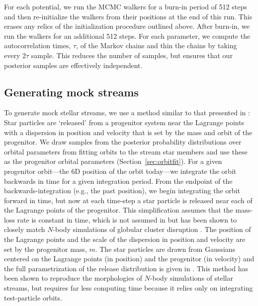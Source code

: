 \documentclass[letterpaper,12pt,preprint]{aastex}
\renewcommand{\changes}[1]{#1}
\begin{document}
For each potential, we run the MCMC walkers for a burn-in period of 512 steps and then re-initialize the walkers from their positions at the end of this run. This erases any relics of the initialization procedure outlined above. After burn-in, we run the walkers for an additional 512 steps. For each parameter, we compute the autocorrelation times, $\tau$, of the Markov chains and thin the chains by taking every $2\tau$ sample. This reduces the number of samples, but ensures that our posterior samples are effectively independent.

\subsection{Generating mock streams}\label{sec:mocks}

To generate mock stellar streams, we use \changes{a method similar to that} presented in \citet{fardal14}: Star particles are `released' from a progenitor system near the Lagrange points with a dispersion in position and velocity that is set by the mass and orbit of the progenitor. We draw samples from the posterior probability distributions over orbital parameters from fitting orbits to the stream star members and use these as the progenitor orbital parameters (Section~\ref{sec:orbitfit}). For a given progenitor orbit---the 6D position of the orbit today---we integrate the orbit backwards in time for a given integration period. From the endpoint of the backwards-integration (e.g., the past position), we begin integrating the orbit forward in time, but now at each time-step a star particle is released near each of the Lagrange points of the progenitor. \changes{This simplification assumes that the mass-loss rate is constant in time, which is not assumed in \citet{fardal14} but has been shown to closely match $N$-body simulations of globular cluster disruption \citep{kuepper12}.} The position of the Lagrange points and the scale of the dispersion in position and velocity are set by the progenitor mass, $m$. The star particles are drawn from Gaussians centered on the Lagrange points (in position) and the progenitor (in velocity) and the full parametrization of the release distribution is given in \cite{fardal14}. This method has been shown to reproduce the morphologies of $N$-body simulations of stellar streams, but requires far less computing time because it relies only on integrating test-particle orbits.
\end{document}
